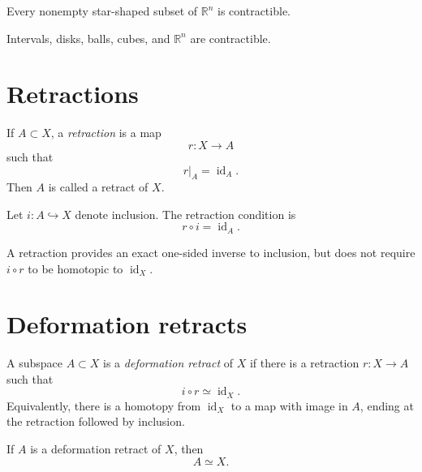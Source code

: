 \begin{proposition}
\label{prop:viii02-star-contract}
Every nonempty star-shaped subset of \(\mathbb R^n\) is contractible.
\end{proposition}

\begin{example}
Intervals, disks, balls, cubes, and \(\mathbb R^n\) are contractible.
\end{example}

\section{Retractions}

\begin{definition}[Retraction]
\label{def:viii02-retraction}
If \(A\subset X\), a \emph{retraction} is a map
\[
r:X\to A
\]
such that
\[
r|_A=\operatorname{id}_A.
\]
Then \(A\) is called a retract of \(X\).
\end{definition}

Let \(i:A\hookrightarrow X\) denote inclusion.  The retraction condition is
\[
r\circ i=\operatorname{id}_A.
\]

\begin{warning}
\label{warn:viii02-retract}
A retraction provides an exact one-sided inverse to inclusion, but does not
require \(i\circ r\) to be homotopic to \(\operatorname{id}_X\).
\end{warning}

\section{Deformation retracts}

\begin{definition}
\label{def:viii02-deformation-retract}
A subspace \(A\subset X\) is a \emph{deformation retract} of \(X\) if there is a
retraction \(r:X\to A\) such that
\[
i\circ r\simeq \operatorname{id}_X.
\]
Equivalently, there is a homotopy from \(\operatorname{id}_X\) to a map with
image in \(A\), ending at the retraction followed by inclusion.
\end{definition}

\begin{theorem}
\label{thm:viii02-dr-equivalence}
If \(A\) is a deformation retract of \(X\), then
\[
A\simeq X.
\]
\end{theorem}

